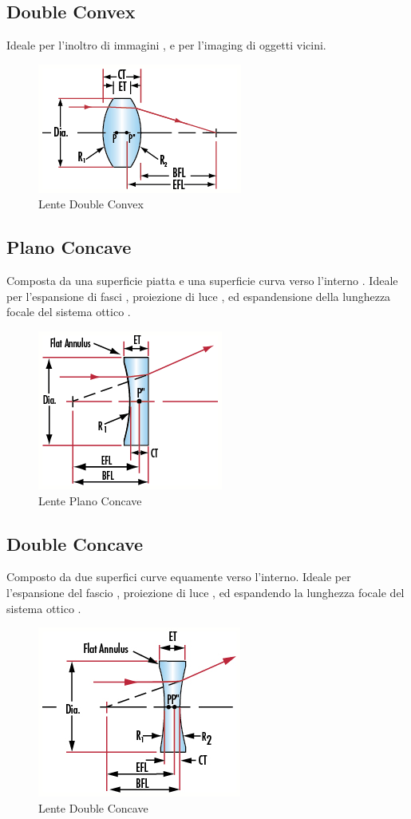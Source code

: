\subsection{Double Convex}
Ideale per l'inoltro di immagini , e per l'imaging di oggetti vicini.
\begin{figure}[!ht]
\centering

\includegraphics[width=.3\textwidth]{img/double-convex.png}

\caption{Lente Double Convex}
\label{fig:ccd-blockdiagram}
\end{figure}

\subsection{Plano Concave}
Composta da una superficie piatta e una superficie curva verso l'interno . Ideale per l'espansione di fasci , proiezione di luce , ed espandensione della lunghezza focale del sistema ottico .

\begin{figure}[!ht]
\centering

\includegraphics[width=.3\textwidth]{img/plano-concave.png}

\caption{Lente Plano Concave}
\label{fig:ccd-blockdiagram}
\end{figure}


\subsection{Double Concave}
Composto da due superfici curve equamente verso l'interno. Ideale per l'espansione del fascio , proiezione di luce , ed espandendo la lunghezza focale del sistema ottico .
\begin{figure}[!ht]
\centering

\includegraphics[width=.3\textwidth]{img/double-concave.png}

\caption{Lente Double Concave}
\label{fig:ccd-blockdiagram}
\end{figure}

